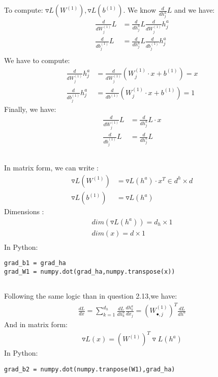 \documentclass[12pt]{article}
\begin{document}
\subsection{}
To compute: $\triangledown L(W^{(1)}), \triangledown L(b^{(1)})$.
We know $\frac{d}{dh^a_j} L$ and we have:
\begin{align*}
\frac{d}{dW^{(1)}_j} L &= \frac{d}{dh^a_j} L \frac{d}{dW^{(1)}_j} h^a_j \\
\frac{d}{db^{(1)}_j} L &= \frac{d}{dh^a_j} L \frac{d}{db^{(1)}_j} h^a_j \\
\end{align*}
We have to compute:
\begin{align*}
\frac{d}{dW^{(1)}_j} h^a_j & = \frac{d}{dW^{(1)}_j} (W^{(1)}_j \cdot x + b^{(1)}) = x \\
\frac{d}{db^{(1)}_{j}} h^a_j &= \frac{d}{db^{(1)}} (W^{(1)}_{j} \cdot x + b^{(1)}) = 1
\end{align*}
Finally, we have:
\begin{align*}
\frac{d}{dW^{(1)}_j} L &= \frac{d}{dh^a_j} L \cdot x\\
\frac{d}{db^{(1)}_j} L &= \frac{d}{dh^a_j} L
\end{align*}
\subsection{}
In matrix form, we can write :
\begin{align*}
\triangledown L(W^{(1)})  & =  \triangledown L(h^a) \cdot x^T \in d^h \times d\\
\triangledown L(b^{(1)})  & = \triangledown L(h^a) 
\end{align*}
Dimensions :
\begin{align*}
dim(\triangledown L(h^a)) = d_h \times 1 \\
dim(x) = d \times 1 \\
\end{align*}
In Python:
\begin{lstlisting}
grad_b1 = grad_ha
grad_W1 = numpy.dot(grad_ha,numpy.transpose(x))
\end{lstlisting}
\subsection{}
Following the same logic than in question 2.13,we have:
\begin{align*}
\frac{dL}{dx} = \sum\limits_{k=1}^{d_h} \frac{dL}{dh^a_k} \frac{dh^a_k}{dx_j} = (W^{(1)}_{\bullet,j})^T \frac{dL}{dh^a}
\end{align*}
And in matrix form:
\begin{align*}
\triangledown L(x) = (W^{(1)})^T \triangledown L (h^a)
\end{align*}
In Python:
\begin{lstlisting}
grad_b2 = numpy.dot(numpy.tranpose(W1),grad_ha)
\end{lstlisting}
\end{document}
